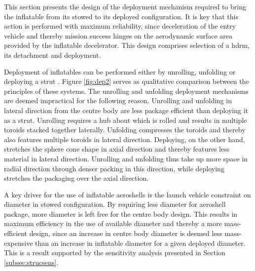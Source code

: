 This section presents the design of the deployment mechanism required to bring the inflatable from its stowed to its deployed configuration. It is key that this action is performed with maximum reliability, since deceleration of the entry vehicle and thereby mission success hinges on the aerodynamic surface area provided by the inflatable decelerator. This design comprises selection of a \acrfull{hdrm}, its detachment and deployment.

Deployment of inflatables can be performed either by unrolling, unfolding or deploying a strut \cite[p.222-227]{Jenkins2001}. Figure \ref{fig:dep2} serves as qualitative comparison between the principles of these systems. The unrolling and unfolding deployment mechanisms are deemed impractical for the following reason. Unrolling and unfolding in lateral direction from the centre body are less package efficient than deploying it as a strut. Unrolling requires a hub about which is rolled and results in multiple toroids stacked together laterally. Unfolding compresses the toroids and thereby also features multiple toroids in lateral direction. Deploying, on the other hand, stretches the sphere cone shape in axial direction and thereby features less material in lateral direction. Unrolling and unfolding thus take up more space in radial direction through denser packing in this direction, while deploying stretches the packaging over the axial direction. 

A key driver for the use of inflatable aeroshells is the launch vehicle constraint on diameter in stowed configuration. By requiring less diameter for aeroshell package, more diameter is left free for the centre body design. This results in maximum efficiency in the use of available diameter and thereby a more mass-efficient design, since an increase in centre body diameter is deemed less mass-expensive than an increase in inflatable diameter for a given deployed diameter. This is a result supported by the sensitivity analysis presented in Section \ref{subsec:strucsens}. 

